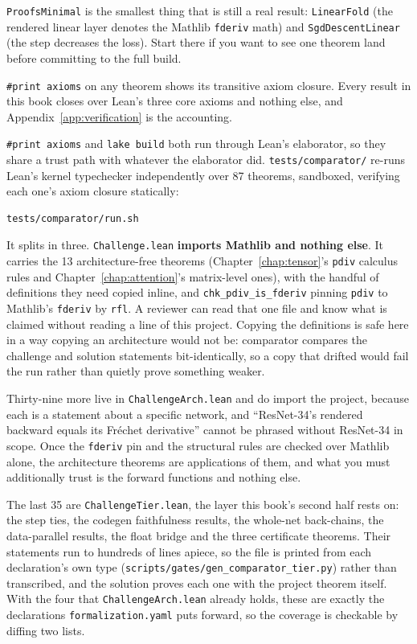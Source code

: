 \texttt{ProofsMinimal} is the smallest thing that is still a real result:
\texttt{LinearFold} (the rendered linear layer denotes the Mathlib
\texttt{fderiv} math) and \texttt{SgdDescentLinear} (the step decreases the
loss). Start there if you want to see one theorem land before committing to
the full build.


\texttt{\#print axioms} on any theorem shows its transitive axiom closure.
Every result in this book closes over Lean's three core axioms and nothing
else, and Appendix~\ref{app:verification} is the accounting.


\texttt{\#print axioms} and \texttt{lake build} both run through Lean's
elaborator, so they share a trust path with whatever the elaborator did.
\texttt{tests/comparator/} re-runs Lean's kernel typechecker independently over
87 theorems, sandboxed, verifying each one's axiom closure statically:

\begin{verbatim}
tests/comparator/run.sh
\end{verbatim}

It splits in three. \texttt{Challenge.lean}
\textbf{imports Mathlib and nothing else}. It carries the 13
architecture-free theorems (Chapter~\ref{chap:tensor}'s \texttt{pdiv} calculus
rules and Chapter~\ref{chap:attention}'s matrix-level ones), with the handful of
definitions they need copied inline, and \texttt{chk\_pdiv\_is\_fderiv} pinning
\texttt{pdiv} to Mathlib's \texttt{fderiv} by \texttt{rfl}. A reviewer can read
that one file and know what is claimed without reading a line of this project.
Copying the definitions is safe here in a way copying an
architecture would not be: comparator compares the challenge and solution
statements bit-identically, so a copy that drifted would fail the run rather
than quietly prove something weaker.

Thirty-nine more live in \texttt{ChallengeArch.lean} and do import the project,
because each is a statement about a specific network, and ``ResNet-34's
rendered backward equals its Fréchet derivative'' cannot be phrased without
ResNet-34 in scope. Once the \texttt{fderiv} pin and the structural rules are
checked over Mathlib alone, the architecture theorems are applications of them,
and what you must additionally trust is the forward functions and nothing else.

The last 35 are \texttt{ChallengeTier.lean}, the layer this book's second
half rests on: the step ties, the codegen faithfulness results, the whole-net
back-chains, the data-parallel results, the float bridge and the three
certificate theorems. Their statements run to hundreds of lines apiece, so the
file is printed from each declaration's own type
(\texttt{scripts/gates/\allowbreak gen\_comparator\_tier.py}) rather than transcribed, and the
solution proves each one with the project theorem itself. With the four that
\texttt{ChallengeArch.lean} already holds, these are exactly the declarations
\texttt{formalization.yaml} puts forward, so the coverage is checkable by
diffing two lists.

